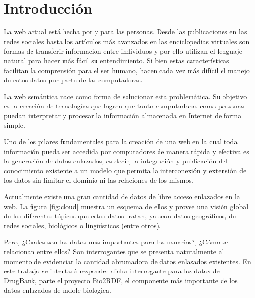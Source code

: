 
\chapter{Introducción}

La web actual está hecha por y para las personas. Desde las publicaciones en las
redes sociales hasta los artículos más avanzados en las enciclopedias virtuales
son formas de transferir información entre individuos y por ello utilizan el
lenguaje natural para hacer más fácil su entendimiento. Si bien estas
características facilitan la comprensión para el ser humano, hacen cada
vez más difícil el manejo de estos datos por parte de las computadoras.

La web semántica nace como forma de solucionar esta problemática. Su objetivo es
la creación de tecnologías que logren que tanto computadoras como personas
puedan interpretar y procesar la información almacenada en Internet
de forma simple.

Uno de los pilares fundamentales para la creación de una web en la cual toda
información pueda ser accedida por computadores de manera rápida y efectiva es
la generación de datos enlazados, es decir, la integración y publicación del 
conocimiento existente a un modelo que permita la interconexión y extensión de
los datos sin limitar el dominio ni las relaciones de los mismos.

Actualmente existe una gran cantidad de datos de libre acceso enlazados en la
web. La figura \ref{fig:cloud} muestra un esquema de ellos y provee una visión
global de los diferentes tópicos que estos datos tratan, ya sean datos
geográficos, de redes sociales, biológicos o lingüísticos (entre otros).

Pero, ¿Cuales son los datos más importantes para los usuarios?, ¿Cómo se
relacionan entre ellos? Son interrogantes que se presenta naturalmente al
momento de evidenciar la cantidad abrumadora de datos enlazados existentes.
En este trabajo se intentará responder dicha interrogante para los datos de
DrugBank, parte el proyecto Bio2RDF, el componente más importante de los datos
enlazados de índole biológica.

\begin{sidewaysfigure}
  \centering
  \caption{Conexiones entre las bases de datos abiertas hasta agosto del 2014.}
  \vspace{-.25cm}
  \caption*{Creado por Linked Open Data Cloud project\cite{lod:cloud}.}
  \label{fig:cloud}
\end{sidewaysfigure}

